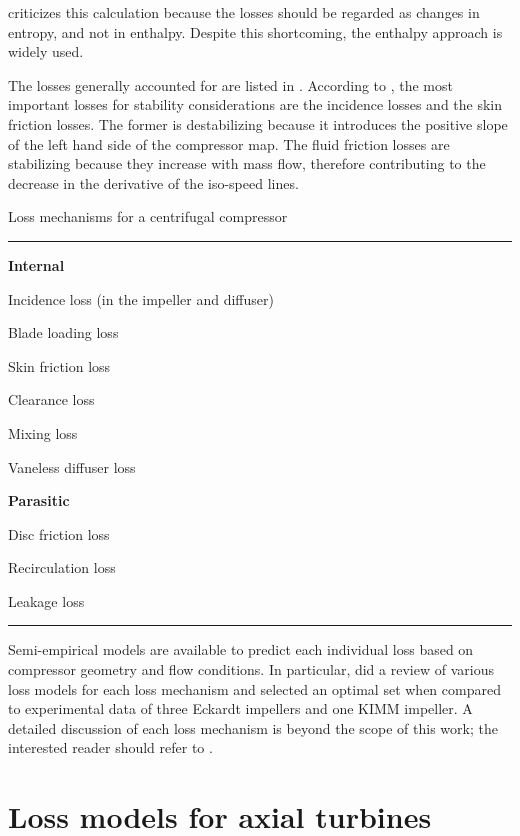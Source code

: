 \textcite{Aungier1995} criticizes this calculation because the losses should be regarded as changes in entropy, and not in enthalpy. Despite this shortcoming, the enthalpy approach is widely used.

The losses generally accounted for are listed in . According to \textcite{Gravdahl2004,Gravdahl1999,Watson1982}, the most important losses for stability considerations are the incidence losses and the skin friction losses. The former is destabilizing because it introduces the positive slope of the left hand side of the compressor map. The fluid friction losses are stabilizing because they increase with mass flow, therefore contributing to the decrease in the derivative of the iso-speed lines.
\begin{table}
\caption{Loss mechanisms for a centrifugal compressor}
\label{tbl:compressor_loss_mechanisms}
\hrule
\begin{multicols}{2}
\begin{compactitem}
    \item[] \textbf{Internal}
    \item Incidence loss (in the impeller and diffuser)
    \item Blade loading loss
    \item Skin friction loss
    \item Clearance loss
    \item Mixing loss
    \item Vaneless diffuser loss
    \columnbreak
    \item[] \textbf{Parasitic}
    \item Disc friction loss
    \item Recirculation loss
    \item Leakage loss
\end{compactitem}
\end{multicols}
\hrule
{}
\end{table}

Semi-empirical models are available to predict each individual loss based on compressor geometry and flow conditions. 
In particular, \textcite{Oh1997} did a review of various loss models for each loss mechanism and selected an optimal set when compared to experimental data of three Eckardt impellers and one KIMM impeller.
A detailed discussion of each loss mechanism is beyond the scope of this work; 
the interested reader should refer to \textcite{Cumpsty2004}.

\section{Loss models for axial turbines}

